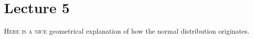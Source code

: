\documentclass[lectures]{subfiles}
\begin{document}
\section{Lecture 5}
\label{sec:lecture-5}





\textsc{Here is a nice} geometrical explanation of how the normal distribution originates.
\end{document}
